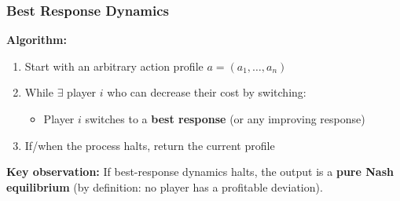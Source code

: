 \bigseparator

\subsubsection{Best Response Dynamics}

\begin{defbox}
\textbf{Algorithm:}
\begin{enumerate}
  \item Start with an arbitrary action profile $a = (a_1, \ldots, a_n)$
  \item While $\exists$ player $i$ who can decrease their cost by switching:
  \begin{itemize}
    \item Player $i$ switches to a \textbf{best response} (or any improving response)
  \end{itemize}
  \item If/when the process halts, return the current profile
\end{enumerate}

\textbf{Key observation:} If best-response dynamics halts, the output is a \textbf{pure Nash equilibrium} (by definition: no player has a profitable deviation).
\end{defbox}

